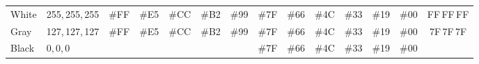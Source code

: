 \begin{infobox}
\begin{centering}
\begin{tabular}{llcccccccccccc}
{\footnotesize White} & {\footnotesize 255,\,255,\,255} & {\footnotesize \cellcolor{white}\#FF} & {\footnotesize \cellcolor{white!90!shadecolor}\#E5} & {\footnotesize \cellcolor{white!80!shadecolor}\#CC} & {\footnotesize \cellcolor{white!70!shadecolor}\#B2} & {\footnotesize \cellcolor{white!60!shadecolor}\#99} & {\footnotesize \cellcolor{white!50!shadecolor}\#7F} & {\footnotesize \cellcolor{white!40!shadecolor}\#66} & {\footnotesize \cellcolor{white!30!shadecolor}\#4C} & {\footnotesize \cellcolor{white!20!shadecolor}\#33} & {\footnotesize \cellcolor{white!10!shadecolor}\#19} & {\footnotesize \#00} & {\footnotesize \cellcolor{white!100!shadecolor}FF\,FF\,FF}\tabularnewline
{\footnotesize Gray} & {\footnotesize 127,\,127,\,127} & {\footnotesize \cellcolor{gray}\#FF} & {\footnotesize \cellcolor{gray!90!shadecolor}\#E5} & {\footnotesize \cellcolor{gray!80!shadecolor}\#CC} & {\footnotesize \cellcolor{gray!70!shadecolor}\#B2} & {\footnotesize \cellcolor{gray!60!shadecolor}\#99} & {\footnotesize \cellcolor{gray!50!shadecolor}\#7F} & {\footnotesize \cellcolor{gray!40!shadecolor}\#66} & {\footnotesize \cellcolor{gray!30!shadecolor}\#4C} & {\footnotesize \cellcolor{gray!20!shadecolor}\#33} & {\footnotesize \cellcolor{gray!10!shadecolor}\#19} & {\footnotesize \#00} & {\footnotesize \cellcolor{gray!100!shadecolor}7F\,7F\,7F}\tabularnewline
{\footnotesize Black} & \multicolumn{1}{l}{{\footnotesize 0,\,0,\,0}} & {\footnotesize \cellcolor{black}}\textcolor{white}{\footnotesize \#FF} & {\footnotesize \cellcolor{black!90!shadecolor}}\textcolor{white}{\footnotesize \#E5} & {\footnotesize \cellcolor{black!80!shadecolor}}\textcolor{white}{\footnotesize \#CC} & {\footnotesize \cellcolor{black!70!shadecolor}}\textcolor{white}{\footnotesize \#B2} & {\footnotesize \cellcolor{black!60!shadecolor}}\textcolor{white}{\footnotesize \#99} & {\footnotesize \cellcolor{black!50!shadecolor}\#7F} & {\footnotesize \cellcolor{black!40!shadecolor}\#66} & {\footnotesize \cellcolor{black!30!shadecolor}\#4C} & {\footnotesize \cellcolor{black!20!shadecolor}\#33} & {\footnotesize \cellcolor{black!10!shadecolor}\#19} & {\footnotesize \#00} & {\footnotesize \cellcolor{black!100!shadecolor}}\textcolor{white}{\footnotesize 00\,00\,00}\tabularnewline
\bottomrule
\end{tabular}
\par\end{centering}

\noindent \vspace*{1pt}


\begin{spacing}{0.75}
\noindent \begin{centering}
{\footnotesize }%
\begin{minipage}[t]{0.94\columnwidth}%
\begin{spacing}{0.75}
\end{spacing}
%
\end{minipage}\medskip{}


\end{centering}
\end{spacing}
\end{infobox}

